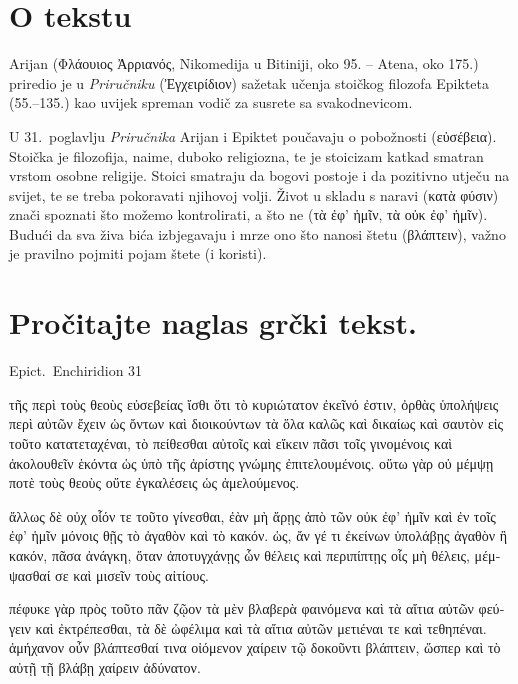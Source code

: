 


\section*{O tekstu}

Arijan \textgreek[variant=ancient]{(Φλάουιος Ἀρριανός,} Nikomedija u Bitiniji, oko 95. – Atena, oko 175.) priredio je u \textit{Priručniku} \textgreek[variant=ancient]{(Ἐγχειρίδιον)} sažetak učenja stoičkog filozofa Epikteta (55.–135.) kao uvijek spreman vodič za susrete sa svakodnevicom.

U 31.\ poglavlju \textit{Priručnika} Arijan i Epiktet poučavaju o pobožnosti \textgreek[variant=ancient]{(εὐσέβεια).} Stoička je filozofija, naime, duboko religiozna, te je stoicizam katkad smatran vrstom osobne religije. Stoici smatraju da bogovi postoje i da pozitivno utječu na svijet, te se treba pokoravati njihovoj volji. Život u skladu s naravi \textgreek[variant=ancient]{(κατὰ φύσιν)} znači spoznati što možemo kontrolirati, a što ne \textgreek[variant=ancient]{(τὰ ἐφ' ἡμῖν, τὰ οὐκ ἐφ' ἡμῖν).} Budući da sva živa bića izbjegavaju i mrze ono što nanosi štetu \textgreek[variant=ancient]{(βλάπτειν),} važno je pravilno pojmiti pojam štete (i koristi).


\section*{Pročitajte naglas grčki tekst.}

Epict.\ Enchiridion 31


\medskip


{\large

\begin{greek}

\noindent τῆς περὶ τοὺς θεοὺς εὐσεβείας ἴσθι ὅτι τὸ κυριώτατον ἐκεῖνό ἐστιν, ὀρθὰς ὑπολήψεις περὶ αὐτῶν ἔχειν ὡς ὄντων καὶ διοικούντων τὰ ὅλα καλῶς καὶ δικαίως καὶ σαυτὸν εἰς τοῦτο κατατεταχέναι, τὸ πείθεσθαι αὐτοῖς καὶ εἴκειν πᾶσι τοῖς γινομένοις καὶ ἀκολουθεῖν ἑκόντα ὡς ὑπὸ τῆς ἀρίστης γνώμης ἐπιτελουμένοις. οὕτω γὰρ οὐ μέμψῃ ποτὲ τοὺς θεοὺς οὔτε ἐγκαλέσεις ὡς ἀμελούμενος.

\noindent ἄλλως δὲ οὐχ οἷόν τε τοῦτο γίνεσθαι, ἐὰν μὴ ἄρῃς ἀπὸ τῶν οὐκ ἐφ' ἡμῖν καὶ ἐν τοῖς ἐφ' ἡμῖν μόνοις θῇς τὸ ἀγαθὸν καὶ τὸ κακόν. ὡς, ἄν γέ τι ἐκείνων ὑπολάβῃς ἀγαθὸν ἢ κακόν, πᾶσα ἀνάγκη, ὅταν ἀποτυγχάνῃς ὧν θέλεις καὶ περιπίπτῃς οἷς μὴ θέλεις, μέμψασθαί σε καὶ μισεῖν τοὺς αἰτίους.

\noindent πέφυκε γὰρ πρὸς τοῦτο πᾶν ζῷον τὰ μὲν βλαβερὰ φαινόμενα καὶ τὰ αἴτια αὐτῶν φεύγειν καὶ ἐκτρέπεσθαι, τὰ δὲ ὠφέλιμα καὶ τὰ αἴτια αὐτῶν μετιέναι τε καὶ τεθηπέναι. ἀμήχανον οὖν βλάπτεσθαί τινα οἰόμενον χαίρειν τῷ δοκοῦντι βλάπτειν, ὥσπερ καὶ τὸ αὐτῇ τῇ βλάβῃ χαίρειν ἀδύνατον.

\end{greek}

}


